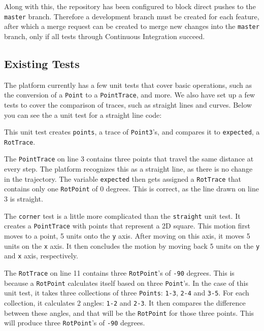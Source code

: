 \documentclass{standalone}
\begin{document}
  Along with this, the repository has been configured to block direct pushes to
  the \verb_master_ branch. Therefore a development branch must be created for
  each feature, after which a merge request can be created to merge new changes
  into the \verb_master_ branch, only if all tests through Continuous
  Integration succeed.

  \subsection{Existing Tests}
  The platform currently has a few unit tests that cover basic operations, such
  as the conversion of a \verb_Point_ to a \verb_PointTrace_, and more. We also
  have set up a few tests to cover the comparison of traces, such as straight
  lines and curves. Below you can see the a unit test for a straight line code:
  

  This unit test creates \verb_points_, a trace of \verb_Point3_'s, and compares
  it to \verb_expected_, a \verb_RotTrace_.

  The \verb_PointTrace_ on line 3 contains three points that travel the same
  distance at every step. The platform recognizes this as a straight line, as
  there is no change in the trajectory. The variable \verb_expected_ then gets
  assigned a \verb_RotTrace_ that contains only one \verb_RotPoint_ of 0
  degrees. This is correct, as the line drawn on line 3 is straight.

  
  The \verb_corner_ test is a little more complicated than the \verb_straight_
  unit test. It creates a \verb_PointTrace_ with points that represent a 2D
  square. This motion first moves to a point, 5 units onto the \verb_y_ axis.
  After moving on this axis, it moves 5 units on the \verb_x_ axis. It then
  concludes the motion by moving back 5 units on the \verb_y_ and \verb_x_ axis,
  respectively.

  The \verb_RotTrace_ on line 11 contains three \verb_RotPoint_'s of \verb_-90_
  degrees. This is because a \verb_RotPoint_ calculates itself based on three
  \verb_Point_'s. In the case of this unit test, it takes three collections of
  three \verb_Points_: \verb_1-3_, \verb_2-4_ and \verb_3-5_. For each
  collection, it calculates 2 angles: \verb_1-2_ and \verb_2-3_. It then
  compares the difference between these angles, and that will be the
  \verb_RotPoint_ for those three points. This will produce three
  \verb_RotPoint_'s of \verb_-90_ degrees.
\end{document}
